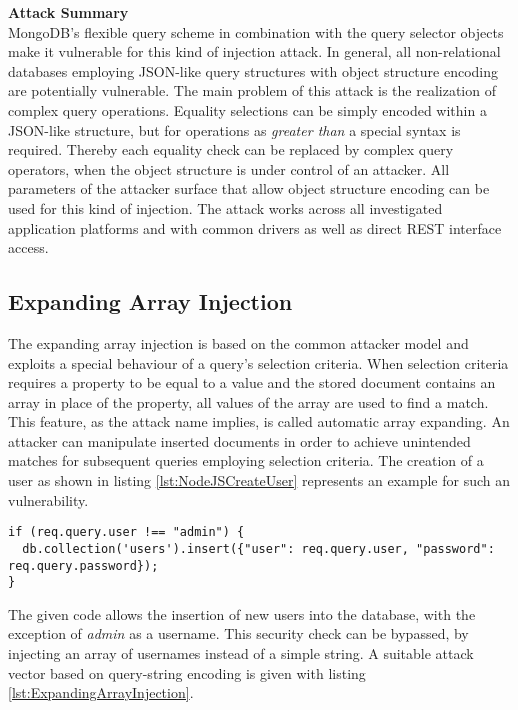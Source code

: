 \textbf{Attack Summary} \\
MongoDB's flexible query scheme in combination with the query selector objects make it vulnerable for this kind of injection attack. In general, all non-relational databases employing JSON-like query structures with object structure encoding are potentially vulnerable. The main problem of this attack is the realization of complex query operations. Equality selections can be simply encoded within a JSON-like structure, but for operations as \emph{greater than} a special syntax is required. Thereby each equality check can be replaced by complex query operators, when the object structure is under control of an attacker. All parameters of the attacker surface that allow object structure encoding can be used for this kind of injection. The attack works across all investigated application platforms and with common drivers as well as direct REST interface access. 

\subsection{Expanding Array Injection}
The expanding array injection is based on the common attacker model and exploits a special behaviour of a query's selection criteria. When selection criteria requires a property to be equal to a value and the stored document contains an array in place of the property, all values of the array are used to find a match. This feature, as the attack name implies, is called automatic array expanding. An attacker can manipulate inserted documents in order to achieve unintended matches for subsequent queries employing selection criteria. The creation of a user as shown in listing \ref{lst:NodeJSCreateUser} represents an example for such an vulnerability. \\

\begin{lstlisting}[caption={Vulnerable NodeJS example for expanding array injection on MongoDB}, label={lst:NodeJSCreateUser}]
if (req.query.user !== "admin") {
  db.collection('users').insert({"user": req.query.user, "password": req.query.password});
}
\end{lstlisting}

The given code allows the insertion of new users into the database, with the exception of \emph{admin} as a username. This security check can be bypassed, by injecting an array of usernames instead of a simple string. A suitable attack vector based on query-string encoding is given with listing \ref{lst:ExpandingArrayInjection}.\\

